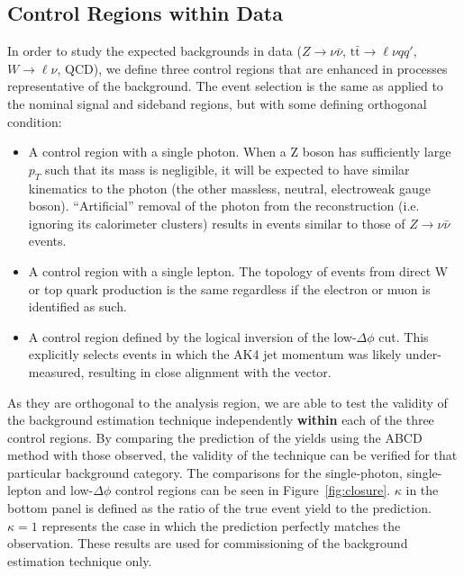 \subsection{Control Regions within Data}
\label{sec:smbkg}


In order to study the expected backgrounds in data ($Z\rightarrow\nu\bar{\nu}$, $\mathrm{t}\bar{\mathrm{t}} \rightarrow \ell \nu q q'$, $W\rightarrow\ell\nu$, QCD), we define three control regions that are enhanced in processes representative of the background. The event selection is the same as applied to the nominal signal and sideband regions, but with some defining orthogonal condition:

\begin{itemize}

\item A control region with a single photon. When a Z boson has sufficiently large $p_{T}$ such that its mass is negligible, it will be expected to have similar kinematics to the photon (the other massless, neutral, electroweak gauge boson). ``Artificial'' removal of the photon from the reconstruction (i.e. ignoring its calorimeter clusters) results in events similar to those of $Z\rightarrow\nu\bar{\nu}$ events.

\item A control region with a single lepton. The topology of events from direct W or top quark production is the same regardless if the electron or muon is identified as such. 

\item A control region defined by the logical inversion of the low-$\Delta\phi$ cut. This explicitly selects events in which the AK4 jet momentum was likely under-measured, resulting in close alignment with the \ptmiss vector.

\end{itemize}

As they are orthogonal to the analysis region, we are able to test the validity of the background estimation technique independently \textbf{within} each of the three control regions. By comparing the prediction of the yields using the ABCD method with those observed, the validity of the technique can be verified for that particular background category. The comparisons for the single-photon, single-lepton and low-$\Delta\phi$ control regions can be seen in Figure~\ref{fig:closure}. $\kappa$ in the bottom panel is defined as the ratio of the true event yield to the prediction. $\kappa=1$ represents the case in which the prediction perfectly matches the observation. These results are used for commissioning of the background estimation technique only.

